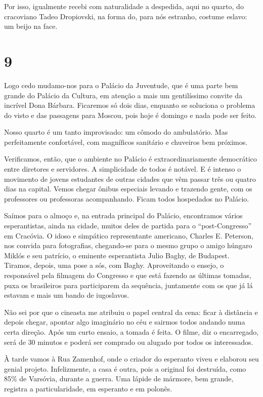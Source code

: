Por isso, igualmente recebi com naturalidade a despedida, aqui no quarto, do cracoviano Tadeo Dropiovski, na forma do, para nós estranho, costume eslavo: um beijo na face.

\section*{9 \adfflatleafright {}}
Logo cedo mudamo-nos para o Palácio da Juventude, que é uma parte bem grande do Palácio da Cultura, em atenção a mais um gentilíssimo convite da incrível Dona Bárbara. Ficaremos só dois dias, enquanto se soluciona o problema do visto e das passagens para Moscou, pois hoje é domingo e nada pode ser feito.

Nosso quarto é um tanto improvisado: um cômodo do ambulatório. Mas perfeitamente confortável, com magníficos sanitário e chuveiros bem próximos.

Verificamos, então, que o ambiente no Palácio é extraordinariamente democrático entre diretores e servidores. A simplicidade de todos é notável. E é intenso o movimento de jovens estudantes de outras cidades que vêm passar três ou quatro dias na capital. Vemos chegar ônibus especiais levando e trazendo gente, com os professores ou professoras acompanhando. Ficam todos hospedados no Palácio.

Saímos para o almoço e, na entrada principal do Palácio, encontramos vários esperantistas, ainda na cidade, muitos deles de partida para o ``post-Congresso'' em Cracóvia. O idoso e simpático representante americano, Charles E. Peterson, nos convida para fotografias, chegando-se para o mesmo grupo o amigo húngaro Miklós e seu patrício, o eminente esperantista Julio Baghy, de Budapest. Tiramos, depois, uma pose a sós, com Baghy. Aproveitando o ensejo, o responsável pela filmagem do Congresso e que está fazendo as últimas tomadas, puxa os brasileiros para participarem da sequência, juntamente com os que já lá estavam e mais um bando de iugoslavos.

Não sei por que o cineasta me atribuiu o papel central da cena: ficar à distância e depois chegar, apontar algo imaginário no céu e sairmos todos andando numa certa direção. Após um curto ensaio, a tomada é feita. O filme, diz o encarregado, será de 30 minutos e poderá ser comprado ou alugado por todos os interessados.

À tarde vamos à Rua Zamenhof, onde o criador do esperanto viveu e elaborou seu genial projeto. Infelizmente, a casa é outra, pois a original foi destruída, como 85\% de Varsóvia, durante a guerra. Uma lápide de mármore, bem grande, registra a particularidade, em esperanto e em polonês.

